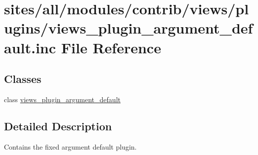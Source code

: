 \hypertarget{views__plugin__argument__default_8inc}{
\section{sites/all/modules/contrib/views/plugins/views\_\-plugin\_\-argument\_\-default.inc File Reference}
\label{views__plugin__argument__default_8inc}
}
\subsection*{Classes}
\begin{CompactItemize}
\item 
class \hyperlink{classviews__plugin__argument__default}{views\_\-plugin\_\-argument\_\-default}
\end{CompactItemize}


\subsection{Detailed Description}
Contains the fixed argument default plugin. 